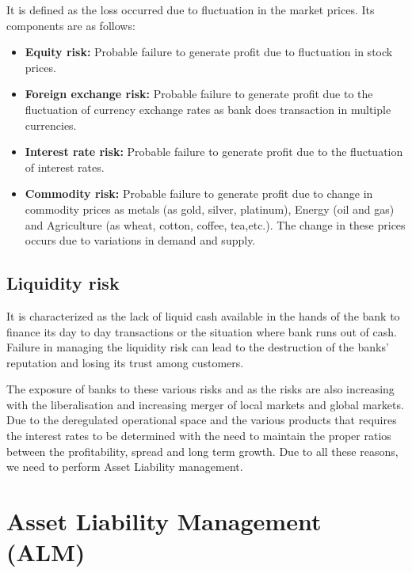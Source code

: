 		It is defined as the loss occurred due to fluctuation in the market prices. Its components are as follows:
		
		\begin{itemize}
		
			\item \textbf{Equity risk: }Probable failure to generate profit due to fluctuation in stock prices.
			
			\item \textbf{Foreign exchange risk: }Probable failure to generate profit due to the fluctuation of currency exchange rates as bank does transaction in multiple currencies.
			
			\item \textbf{Interest rate risk: }Probable failure to generate profit due to the fluctuation of interest rates.
			
			\item \textbf{Commodity risk: }Probable failure to generate profit due to change in commodity prices as metals (as gold, silver, platinum), Energy (oil and gas) and Agriculture (as wheat, cotton, coffee, tea,etc.). The change in these prices occurs due to variations in demand and supply.

		\end{itemize}

	\subsection{Liquidity risk}

		It is characterized as the lack of liquid cash available in the hands of the bank to finance its day to day transactions or the situation where bank runs out of cash. Failure in managing the liquidity risk can lead to the destruction of the banks' reputation and losing its trust among customers.

The exposure of banks to these various risks and as the risks are also increasing with the liberalisation and increasing merger of local markets and global markets. Due to the deregulated operational space and the various products that requires the interest rates to be determined with the need to maintain the proper ratios between the profitability, spread and long term growth. Due to all these reasons, we need to perform Asset Liability management.


	
\section{Asset Liability Management (ALM)}

